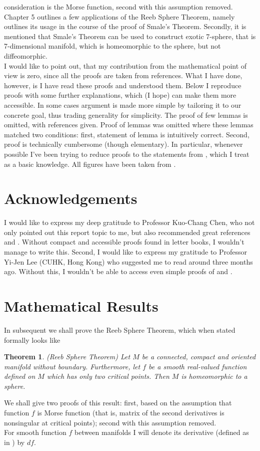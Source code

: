 \documentclass[8pt]{article} %
\newtheorem{theorem}{Theorem}
\begin{document}
consideration is the Morse function, second with this assumption removed.\\
Chapter 5 outlines a few applications of the Reeb Sphere Theorem, namely outlines its usage in the course of the proof of Smale's Theorem. Secondly,
it is mentioned that Smale's Theorem can be used to construct exotic 7-sphere, that is 7-dimensional manifold, which is homeomorphic to the sphere,
but not diffeomorphic.\\
I would like to point out, that my contribution from the mathematical point of view is zero, since all the proofs are taken from references. What I have done, however, is I have read these proofs and understood them. Below I reproduce
proofs with some further explanations, which (I hope) can make them more accessible. In some cases argument is made more simple by tailoring it to our concrete goal, thus trading generality for simplicity. The proof of few lemmas
is omitted, with references given. Proof of lemmas was omitted where these lemmas matched two conditions: first, statement of lemma is intuitively correct. Second, proof is technically cumbersome (though elementary). In particular,
whenever possible I've been trying to reduce proofs to the statements from \cite{topoFrom}, which I treat as a basic knowledge. All figures have been taken from \cite{diffTopo}.
\section{Acknowledgements}
I would like to express my deep gratitude to Professor Kuo-Chang Chen, who not only pointed out this report topic to me, but also recommended great references \cite{morseTh} and \cite{diffTopo}. Without compact and accessible proofs
found in letter books, I wouldn't manage to write this. Second, I would like to express my gratitude to Professor Yi-Jen Lee (CUHK, Hong Kong) who suggested me to read \cite{topoFrom} around three months ago. Without this, I wouldn't
be able to access even simple proofs of \cite{morseTh} and \cite{diffTopo}.
\section{Mathematical Results}
In subsequent we shall prove the Reeb Sphere Theorem, which when stated formally looks like
\begin{theorem}\emph{(Reeb Sphere Theorem) }Let $M$ be a connected, compact and oriented manifold without boundary. Furthermore, let $f$ be a smooth real-valued function defined on $M$ which has only two critical points. Then $M$ is
	homeomorphic to a sphere.
\end{theorem}
We shall give two proofs of this result: first, based on the assumption that function $f$ is Morse function (that is, matrix of the second derivatives is nonsingular at critical points); second with this assumption removed.\\
For smooth function $f$ between manifolds I will denote its derivative (defined as in \cite[p.2]{diffTopo}) by $df$.
\end{document}
